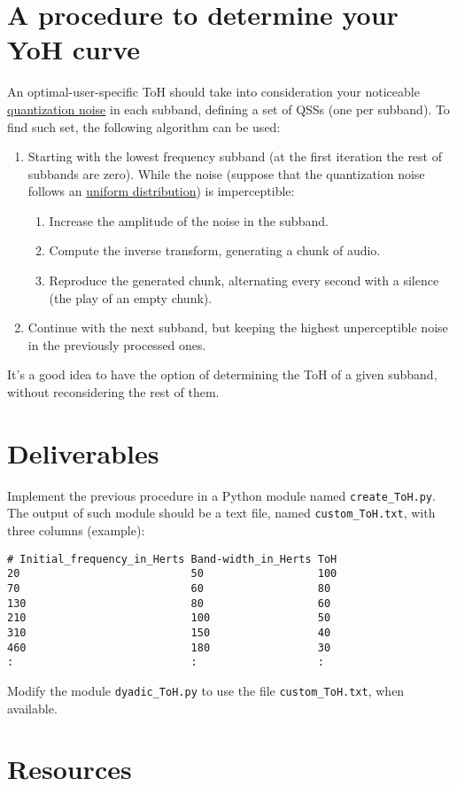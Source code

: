 \section{A procedure to determine your YoH curve}

An optimal-user-specific ToH
should take into consideration your noticeable
\href{https://en.wikipedia.org/wiki/Quantization_(signal_processing)}{quantization
  noise} in each subband, defining a set of QSSs (one per subband). To
find such set, the following algorithm can be used:

\begin{enumerate}
\item %
  Starting with the lowest frequency subband (at the first
  iteration the rest of subbands are zero). While the noise
  (suppose that the quantization noise follows an
  \href{https://en.wikipedia.org/wiki/Continuous_uniform_distribution}{uniform
    distribution}) is imperceptible:
  \begin{enumerate}
  \item Increase the amplitude of the noise in the subband.
  \item Compute the inverse transform, generating a chunk of audio.
  \item Reproduce the generated chunk, alternating every second with
    a silence (the play of an empty chunk).
  \end{enumerate}
\item Continue with the next subband, but keeping the
  highest unperceptible noise in the previously processed
  ones.
\end{enumerate}

It's a good idea to have the option of determining the ToH of a given
subband, without reconsidering the rest of them.

\section{Deliverables}

Implement the previous procedure in a Python module named
\verb|create_ToH.py|. The output of such module should be a text file,
named \verb|custom_ToH.txt|, with three columns (example):
\begin{verbatim}
# Initial_frequency_in_Herts Band-width_in_Herts ToH
20                           50                  100
70                           60                  80
130                          80                  60
210                          100                 50
310                          150                 40
460                          180                 30
:                            :                   :
\end{verbatim}

Modify the module \verb|dyadic_ToH.py| to use the file
\verb|custom_ToH.txt|, when available.

\section{Resources}



